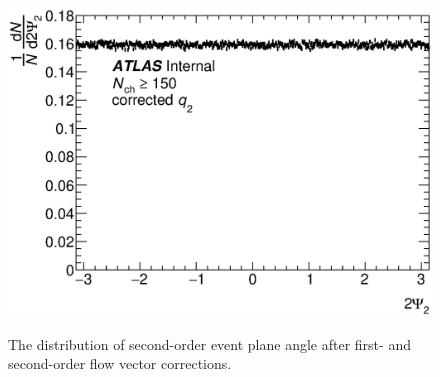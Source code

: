 \begin{figure}[t]
\centering
\includegraphics{dNdpsi2.eps}\\
\caption{The distribution of second-order event plane angle after first- and second-order flow vector corrections.}
\label{fig:dNdpsi2_corr}
\end{figure}

